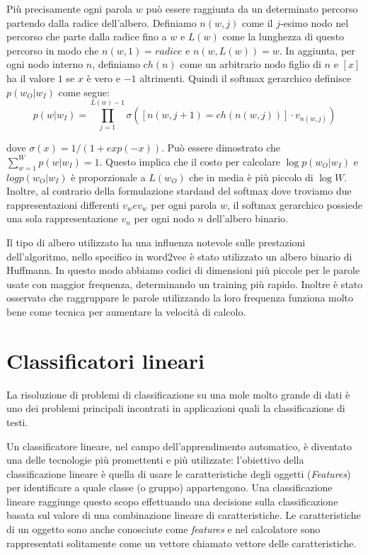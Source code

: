 \documentclass[a4paper,12pt,openright,twoside]{report}
\theoremstyle{definition}
\begin{document}
Più precisamente ogni parola $w$ può essere raggiunta da un determinato percorso partendo dalla radice
dell'albero. Definiamo $n(w,j)$ come il $j$-esimo nodo nel percorso che parte dalla radice fino a $w$ e $L(w)$ come
la lunghezza di questo percorso in modo che $n(w,1) = radice$ e $n(w,L(w)) = w$.
In aggiunta, per ogni nodo interno $n$, definiamo $ch(n)$ come un arbitrario nodo figlio di $n$ e $[x]$ ha il valore $1$ se $x$ è vero e $-1$ altrimenti.
Quindi il softmax gerarchico definisce $p(w_O|w_I)$ come segue:
\begin{equation}
	p(w|w_I) = \prod_{j=1}^{L(w)-1}\sigma([n(w,j+1)=ch(n(w,j))]\cdot v_{n(w,j)} )
	\label{eq:hierarchicalSoftmax}
\end{equation}

dove $\sigma(x) = 1/(1+exp(-x))$. Può essere dimostrato che $\sum_{w=1}^W p(w|w_I) = 1$. Questo implica
che il costo per calcolare $\log p(w_O|w_I)$ e $log p(w_O|w_I)$ è proporzionale a $L(w_O)$ che in media
è più piccolo di $\log W$.
Inoltre, al contrario della formulazione stardand del softmax dove troviamo due rappresentazioni differenti 
$v_w e v_w$ per ogni parola $w$, il softmax gerarchico possiede una sola rappresentazione $v_n$ per ogni nodo $n$
dell'albero binario.

Il tipo di albero utilizzato ha una influenza notevole sulle prestazioni dell'algoritmo, nello specifico
in word2vec è stato utilizzato un albero binario di Huffmann. In questo modo 
abbiamo codici di dimensioni più piccole per le parole usate con maggior frequenza,
determinando un training più rapido.
Inoltre è stato osservato che raggruppare le parole utilizzando la loro frequenza funziona molto
bene come tecnica per aumentare la velocità di calcolo.

\section{Classificatori lineari}
La risoluzione di problemi di classificazione su una mole molto grande di dati è uno dei problemi principali
incontrati in applicazioni quali la classificazione di testi.

Un classificatore lineare, nel campo dell'apprendimento automatico, è diventato una delle tecnologie più
promettenti e più utilizzate: l'obiettivo della 
classificazione lineare è quella di usare le caratteristiche degli oggetti (\emph{Features}) per identificare
a quale classe (o gruppo) appartengono. 
Una classificazione lineare raggiunge questo scopo effettuando una decisione sulla classificazione basata sul valore di una combinazione lineare di caratteristiche. 
Le caratteristiche di un oggetto sono anche conosciute come \emph{features} e nel calcolatore sono rappresentati solitamente come un vettore chiamato vettore delle caratteristiche.
\end{document}
